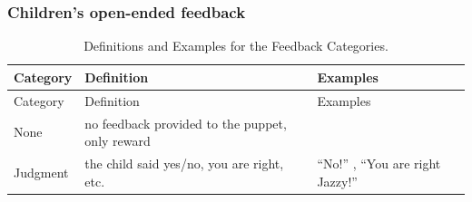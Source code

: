 \documentclass[oneside]{report}
\theoremstyle{definition}
\theoremstyle{definition}
\theoremstyle{definition}
\theoremstyle{remark}
\begin{document}
\subsubsection{Children's open-ended
feedback}\label{childrens-open-ended-feedback}
\begin{longtable}[]{@{}lll@{}}
\caption{\label{tab:feedbackCat} Definitions and Examples for the Feedback
Categories.}\tabularnewline
\toprule
\begin{minipage}[b]{0.16\columnwidth}\raggedright\strut
Category\strut
\end{minipage} & \begin{minipage}[b]{0.44\columnwidth}\raggedright\strut
Definition\strut
\end{minipage} & \begin{minipage}[b]{0.24\columnwidth}\raggedright\strut
Examples\strut
\end{minipage}\tabularnewline
\midrule
\endfirsthead
\toprule
\begin{minipage}[b]{0.16\columnwidth}\raggedright\strut
Category\strut
\end{minipage} & \begin{minipage}[b]{0.44\columnwidth}\raggedright\strut
Definition\strut
\end{minipage} & \begin{minipage}[b]{0.24\columnwidth}\raggedright\strut
Examples\strut
\end{minipage}\tabularnewline
\midrule
\endhead
\begin{minipage}[t]{0.16\columnwidth}\raggedright\strut
None\strut
\end{minipage} & \begin{minipage}[t]{0.44\columnwidth}\raggedright\strut
no feedback provided to the puppet, only reward\strut
\end{minipage} & \begin{minipage}[t]{0.24\columnwidth}\raggedright\strut
\strut
\end{minipage}\tabularnewline
\begin{minipage}[t]{0.16\columnwidth}\raggedright\strut
Judgment\strut
\end{minipage} & \begin{minipage}[t]{0.44\columnwidth}\raggedright\strut
the child said yes/no, you are right, etc.\strut
\end{minipage} & \begin{minipage}[t]{0.24\columnwidth}\raggedright\strut
``No!'' , ``You are right Jazzy!''\strut
\end{minipage}\tabularnewline

\end{longtable}
\end{document}
